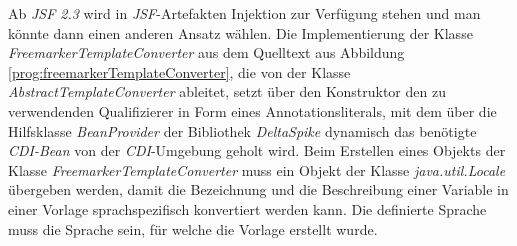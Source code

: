 \newline
\newline
Ab \emph{JSF 2.3} wird in \emph{JSF}-Artefakten Injektion zur Verfügung stehen und man könnte dann einen anderen Ansatz wählen. Die Implementierung der Klasse \emph{FreemarkerTemplateConverter} aus dem Quelltext aus Abbildung \ref{prog:freemarkerTemplateConverter}, die von der Klasse \emph{AbstractTemplateConverter} ableitet, setzt über den Konstruktor den zu verwendenden Qualifizierer in Form eines Annotationsliterals, mit dem über die Hilfsklasse \emph{BeanProvider} der Bibliothek \emph{DeltaSpike} dynamisch das benötigte \emph{CDI-Bean} von der \emph{CDI}-Umgebung geholt wird. Beim Erstellen eines Objekts der Klasse \emph{FreemarkerTemplateConverter} muss ein Objekt der Klasse \emph{java.util.Locale} übergeben werden, damit die Bezeichnung und die Beschreibung einer Variable in einer Vorlage sprachspezifisch konvertiert werden kann. Die definierte Sprache muss die Sprache sein, für welche die Vorlage erstellt wurde.
\newpage

